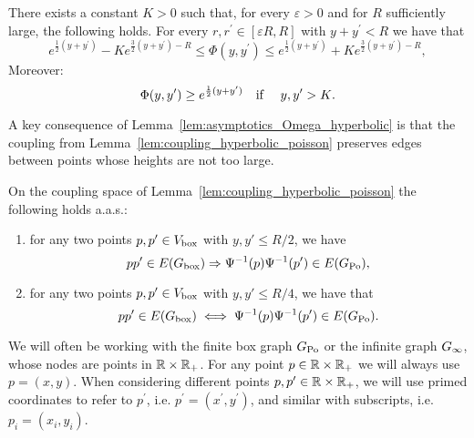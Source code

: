 \begin{lemma}\label{lem:asymptotics_Omega_hyperbolic}
There exists a constant $K>0$ such that, for every $\varepsilon > 0$ and for $R$ sufficiently large, the following holds.
For every $r,r^\prime \in [\varepsilon R,R]$ with $y + y^\prime < R$ we have that 
\begin{equation}\label{eq:asymp1}
	e^{\frac{1}{2}(y+y^\prime)} - K e^{\frac{3}{2}(y+y^\prime) - R} \leq \Phi(y, y^\prime) 
	\leq  e^{\frac{1}{2}(y+y^\prime)} + K e^{\frac{3}{2}(y+y^\prime) - R},
\end{equation}
Moreover:
\begin{equation}\label{eq:asymp2} 
\Phi(y,y^\prime) \geq e^{\frac12(y+y^\prime)} \quad \text{if \quad $y, y^\prime > K$.} 
\end{equation}
\end{lemma}

A key consequence of Lemma~\ref{lem:asymptotics_Omega_hyperbolic} is that the coupling from Lemma~\ref{lem:coupling_hyperbolic_poisson} preserves edges between points whose heights are not too large.  

\begin{lemma}\label{lem:coupling_edges}
On the coupling space of Lemma~\ref{lem:coupling_hyperbolic_poisson} the following holds a.a.s.:
\begin{enumerate}
\item for any two points $p, p' \in V_{\text{box}}$ with $y, y'\le R/2$, we have 
\[
	pp' \in E(G_{\mathrm{box}}) \Rightarrow \Psi^{-1}(p)\Psi^{-1}(p') \in E(G_{{\mathrm{Po}}}),
\]
\item for any two points $p, p' \in V_{\text{box}}$ with $y, y' \le R/4$, we have that 
\[
	pp' \in E(G_{\mathrm{box}}) \iff \Psi^{-1}(p)\Psi^{-1}(p') \in E(G_{{\mathrm{Po}}}).
\]

\end{enumerate}
\end{lemma}

\begin{remark}
We will often be working with the finite box graph $G_{{\mathrm{Po}}}$ or the infinite graph $G_{\infty}$, whose nodes are points 
in ${\mathbb R} \times {\ensuremath{\mathbb R}}_+$. For any point $p \in {\ensuremath{\mathbb R}} \times {\ensuremath{\mathbb R}}_+$ we will always use $p = (x,y)$. 
When considering different points $p,p^\prime \in {\ensuremath{\mathbb R}} \times {\ensuremath{\mathbb R}}_+$, we will use primed coordinates to refer 
to $p^\prime$, i.e. $p^\prime = (x^\prime ,y^\prime)$, and similar with subscripts, i.e. $p_i = (x_i,y_i)$.
\end{remark}

